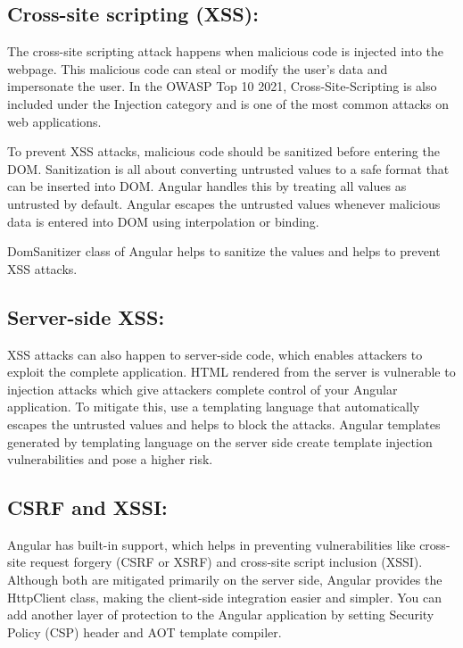 \documentclass{report}
\begin{document}
\subsection*{Cross-site scripting (XSS):}
The cross-site scripting attack happens when malicious code is injected into the webpage. This malicious code can steal or modify the user’s data and impersonate the user. In the OWASP Top 10 2021, Cross-Site-Scripting is also included under the Injection category and is one of the most common attacks on web applications.

To prevent XSS attacks, malicious code should be sanitized before entering the DOM. Sanitization is all about converting untrusted values to a safe format that can be inserted into DOM. Angular handles this by treating all values as untrusted by default. Angular escapes the untrusted values whenever malicious data is entered into DOM using interpolation or binding. 

DomSanitizer class of Angular helps to sanitize the values and helps to prevent XSS attacks.
\subsection*{Server-side XSS:}
XSS attacks can also happen to server-side code, which enables attackers to exploit the complete application. HTML rendered from the server is vulnerable to injection attacks which give attackers complete control of your Angular application. To mitigate this, use a templating language that automatically escapes the untrusted values and helps to block the attacks. Angular templates generated by templating language on the server side create template injection vulnerabilities and pose a higher risk.
\subsection*{CSRF and XSSI:}
Angular has built-in support, which helps in preventing vulnerabilities like cross-site request forgery (CSRF or XSRF) and cross-site script inclusion (XSSI). Although both are mitigated primarily on the server side, Angular provides the HttpClient class, making the client-side integration easier and simpler.
You can add another layer of protection to the Angular application by setting Security Policy (CSP) header and AOT template compiler.
\end{document}
